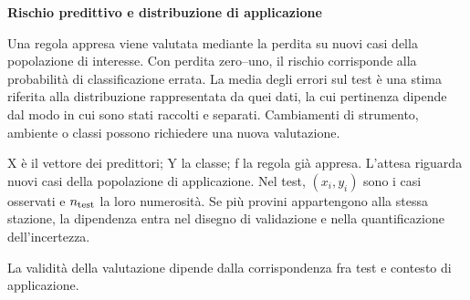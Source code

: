 \documentclass[12pt,aspectratio=1610]{beamer}
\begin{document}
\begin{lrbox}{\TitleBox}\begin{minipage}[t]{18.2cm}\raggedright\sloppy\color{Ink}\fontsize{20.7}{24}\selectfont \bfseries\color{Navy}Rischio predittivo e distribuzione di applicazione\end{minipage}\end{lrbox}
\begin{lrbox}{\BodyBox}\begin{minipage}[t]{10.25cm}\raggedright\sloppy\color{Ink}\fontsize{12.4}{16.4}\selectfont Una regola appresa viene valutata mediante la perdita su nuovi casi della popolazione di interesse. Con perdita zero–uno, il rischio corrisponde alla probabilità di classificazione errata. La media degli errori sul test è una stima riferita alla distribuzione rappresentata da quei dati, la cui pertinenza dipende dal modo in cui sono stati raccolti e separati. Cambiamenti di strumento, ambiente o classi possono richiedere una nuova valutazione.\par{}\end{minipage}\end{lrbox}
\begin{lrbox}{\SideBox}\begin{minipage}[t]{7.45cm}\raggedright\sloppy\color{Ink}\fontsize{12.2}{16.1}\selectfont X è il vettore dei predittori; Y la classe; f la regola già appresa. L’attesa riguarda nuovi casi della popolazione di applicazione. Nel test, $(x_i,y_i)$ sono i casi osservati e $n_{\rm test}$ la loro numerosità. Se più provini appartengono alla stessa stazione, la dipendenza entra nel disegno di validazione e nella quantificazione dell’incertezza.\end{minipage}\end{lrbox}
\begin{lrbox}{\RecallBox}\begin{minipage}[t]{16.45cm}\raggedright\sloppy\color{Ink}\fontsize{10.1}{13.2}\selectfont La validità della valutazione dipende dalla corrispondenza fra test e contesto di applicazione.\end{minipage}\end{lrbox}
\end{document}
